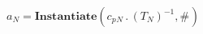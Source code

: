 \documentclass[border=2pt]{standalone}
\begin{document}
${a}{_{N}}=\textbf{Instantiate}({{c_p}}{_{N}} \, . \, \left( {T}{_{N}} \right)^{-1}, {{\#}}{_{}})$
\end{document}
